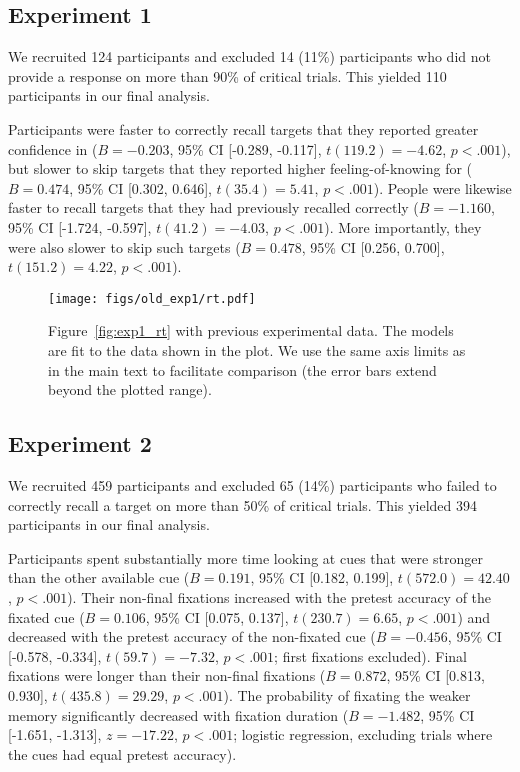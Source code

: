 \subsection{Experiment 1}

We recruited 124 participants and excluded 14 (11\%) participants who did not provide a response on more than 90\% of critical trials. This yielded 110 participants in our final analysis.

Participants were faster to correctly recall targets that they reported greater confidence in ($B = -0.203$, 95\% CI [-0.289, -0.117], $t(119.2)=-4.62$, $p < .001$), but slower to skip targets that they reported higher feeling-of-knowing for ($B = 0.474$, 95\% CI [0.302, 0.646], $t(35.4)=5.41$, $p < .001$). People were likewise faster to recall targets that they had previously recalled correctly ($B = -1.160$, 95\% CI [-1.724, -0.597], $t(41.2)=-4.03$, $p < .001$). More importantly, they were also slower to skip such targets ($B = 0.478$, 95\% CI [0.256, 0.700], $t(151.2)=4.22$, $p < .001$).

\begin{figure*}[ht]
  \texttt{[image: figs/old\_exp1/rt.pdf]}
  \caption{Figure~\ref{fig:exp1_rt} with previous experimental data. The models are fit to the data shown in the plot. We use the same axis limits as in the main text to facilitate comparison (the error bars extend beyond the plotted range).
  }
  \label{fig:old_exp1_rt}
\end{figure*}

\subsection{Experiment 2}

We recruited 459 participants and excluded 65 (14\%) participants who failed to correctly recall a target on more than 50\% of critical trials. This yielded 394 participants in our final analysis.

Participants spent substantially more time looking at cues that were stronger than the other available cue ($B = 0.191$, 95\% CI [0.182, 0.199], $t(572.0)=42.40$, $p < .001$). Their non-final fixations increased with the pretest accuracy of the fixated cue ($B = 0.106$, 95\% CI [0.075, 0.137], $t(230.7)=6.65$, $p < .001$) and decreased with the pretest accuracy of the non-fixated cue ($B = -0.456$, 95\% CI [-0.578, -0.334], $t(59.7)=-7.32$, $p < .001$; first fixations excluded). Final fixations were longer than their non-final fixations ($B = 0.872$, 95\% CI [0.813, 0.930], $t(435.8)=29.29$, $p < .001$). The probability of fixating the weaker memory significantly decreased with fixation duration ($B = -1.482$, 95\% CI [-1.651, -1.313], $z=-17.22$, $p < .001$; logistic regression, excluding trials where the cues had equal pretest accuracy). 

